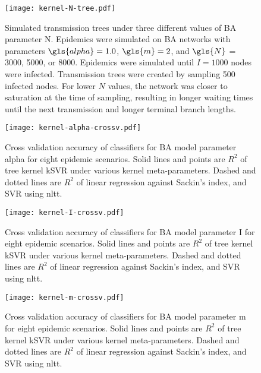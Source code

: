 \begin{figure}[ht]
    \centering
    \texttt{[image: kernel-N-tree.pdf]}
    \caption[
        Simulated transmission trees under three different values of \gls{BA}
        parameter \gls{N}
    ]{
        Simulated transmission trees under three different values of BA
        parameter \gls{N}. Epidemics were simulated on \gls{BA} networks with
        parameters $\gls{alpha} = 1.0$, $\gls{m} = 2$, and $\gls{N}$ = 3000,
        5000, or 8000. Epidemics were simulated until $I = 1000$ nodes were
        infected. Transmission trees were created by sampling 500 infected
        nodes. For lower $N$ values, the network was closer to saturation at
        the time of sampling, resulting in longer waiting times until the next
        transmission and longer terminal branch lengths.
    }
    \label{fig:Ntrees}
\end{figure}

\begin{figure}[ht]
    \centering
    \texttt{[image: kernel-alpha-crossv.pdf]}
    \caption[
        Cross validation accuracy of classifiers for \gls{BA} model parameter
        \gls{alpha} for eight epidemic scenarios.
    ]{
        Cross validation accuracy of classifiers for \gls{BA} model parameter
        \gls{alpha} for eight epidemic scenarios. Solid lines and points are
        $R^2$ of tree kernel \gls{kSVR} under various kernel meta-parameters.
        Dashed and dotted lines are $R^2$ of linear regression against Sackin's
        index, and \gls{SVR} using \gls{nltt}.
    }
    \label{fig:alphacrossv}
\end{figure}

\begin{figure}[ht]
    \centering
    \texttt{[image: kernel-I-crossv.pdf]}
    \caption[
        Cross validation accuracy of classifiers for \gls{BA} model parameter
        \gls{I} for eight epidemic scenarios.
    ]{
        Cross validation accuracy of classifiers for \gls{BA} model parameter
        \gls{I} for eight epidemic scenarios. Solid lines and points are $R^2$
        of tree kernel \gls{kSVR} under various kernel meta-parameters. Dashed
        and dotted lines are $R^2$ of linear regression against Sackin's index,
        and \gls{SVR} using \gls{nltt}.
    }
    \label{fig:Icrossv}
\end{figure}

\begin{figure}[ht]
    \centering
    \texttt{[image: kernel-m-crossv.pdf]}
    \caption[
        Cross validation accuracy of classifiers for \gls{BA} model parameter
        \gls{m} for eight epidemic scenarios.
    ]{
        Cross validation accuracy of classifiers for \gls{BA} model parameter
        \gls{m} for eight epidemic scenarios. Solid lines and points are $R^2$
        of tree kernel \gls{kSVR} under various kernel meta-parameters. Dashed
        and dotted lines are $R^2$ of linear regression against Sackin's index,
        and \gls{SVR} using \gls{nltt}.
    }
    \label{fig:mcrossv}
\end{figure}

